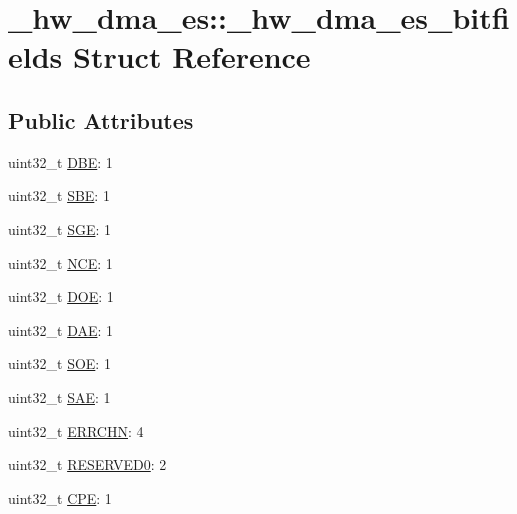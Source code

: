 \hypertarget{struct__hw__dma__es_1_1__hw__dma__es__bitfields}{}\section{\+\_\+hw\+\_\+dma\+\_\+es\+:\+:\+\_\+hw\+\_\+dma\+\_\+es\+\_\+bitfields Struct Reference}
\label{struct__hw__dma__es_1_1__hw__dma__es__bitfields}
\subsection*{Public Attributes}
\begin{DoxyCompactItemize}
\item 
uint32\+\_\+t \hyperlink{struct__hw__dma__es_1_1__hw__dma__es__bitfields_a63fee3df07c2da9f1deb0b5225f91d9f}{D\+BE}\+: 1
\item 
uint32\+\_\+t \hyperlink{struct__hw__dma__es_1_1__hw__dma__es__bitfields_a65ec6728a78b6d07131583990d1fb7d4}{S\+BE}\+: 1
\item 
uint32\+\_\+t \hyperlink{struct__hw__dma__es_1_1__hw__dma__es__bitfields_a2cba9270ec682aa75f284083e6f6cc13}{S\+GE}\+: 1
\item 
uint32\+\_\+t \hyperlink{struct__hw__dma__es_1_1__hw__dma__es__bitfields_a715aca2aa38e16be7d8c1984dffad304}{N\+CE}\+: 1
\item 
uint32\+\_\+t \hyperlink{struct__hw__dma__es_1_1__hw__dma__es__bitfields_af9865028871ddcbfc96b5b915cac7cdd}{D\+OE}\+: 1
\item 
uint32\+\_\+t \hyperlink{struct__hw__dma__es_1_1__hw__dma__es__bitfields_af91d048ad82faad880ad54e6c924441a}{D\+AE}\+: 1
\item 
uint32\+\_\+t \hyperlink{struct__hw__dma__es_1_1__hw__dma__es__bitfields_af95915751d14a611d218ee15bca3a62b}{S\+OE}\+: 1
\item 
uint32\+\_\+t \hyperlink{struct__hw__dma__es_1_1__hw__dma__es__bitfields_adddbdefe741f4d7f84bb1d28f87040e7}{S\+AE}\+: 1
\item 
uint32\+\_\+t \hyperlink{struct__hw__dma__es_1_1__hw__dma__es__bitfields_a23fbc9d074a7f64b819f87507b8db905}{E\+R\+R\+C\+HN}\+: 4
\item 
uint32\+\_\+t \hyperlink{struct__hw__dma__es_1_1__hw__dma__es__bitfields_a1a09de27cfee6247c66961ca4fca8238}{R\+E\+S\+E\+R\+V\+E\+D0}\+: 2
\item 
uint32\+\_\+t \hyperlink{struct__hw__dma__es_1_1__hw__dma__es__bitfields_aafe7fea4c7d50f8d6e7c3d1bb97b4066}{C\+PE}\+: 1

\end{DoxyCompactItemize}
